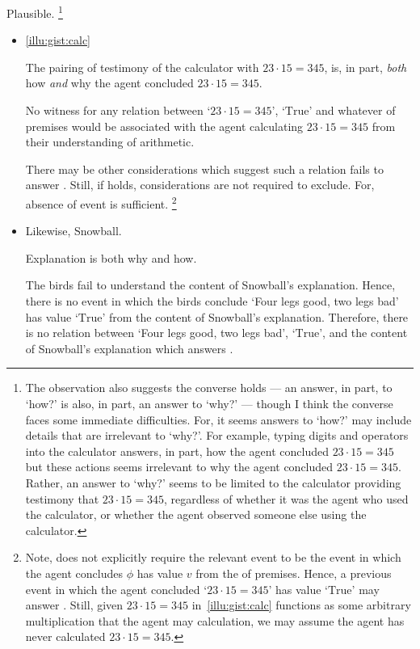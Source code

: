 \begin{note}
  Plausible.%
  \footnote{
    The observation also suggests the converse holds --- an answer, in part, to `how?' is also, in part, an answer to `why?' --- though I think the converse faces some immediate difficulties.
    For, it seems answers to `how?' may include details that are irrelevant to `why?'.
    For example, typing digits and operators into the calculator answers, in part, how the agent concluded \(23 \cdot 15 = 345\) but these actions seems irrelevant to why the agent concluded \(23 \cdot 15 = 345\).
    Rather, an answer to `why?' seems to be limited to the calculator providing testimony that \(23 \cdot 15 = 345\), regardless of whether it was the agent who used the calculator, or whether the agent observed someone else using the calculator.
  }

  \begin{itemize}
  \item
    \autoref{illu:gist:calc}

    The pairing of testimony of the calculator with \(23 \cdot 15 = 345\), is, in part, \emph{both} how \emph{and} why the agent concluded \(23 \cdot 15 = 345\).

    No witness for any relation between `\(23 \cdot 15 = 345\)', `\(\text{True}\)' and whatever \poP{} of premises would be associated with the agent calculating \(23 \cdot 15 = 345\) from their understanding of arithmetic.

    There may be other considerations which suggest such a relation fails to answer \qWhy{}.
    Still, if \issueInclusion{} holds, considerations are not required to exclude.
    For, absence of event is sufficient.%
    \footnote{
      Note, \qHow{} does not explicitly require the relevant event to be the event in which the agent concludes \(\phi\) has value \(v\) from the \poP{} of premises.
      Hence, a previous event in which the agent concluded `\(23 \cdot 15 = 345\)' has value `\(\text{True}\)' may answer \qHow{}.
      Still, given \(23 \cdot 15 = 345\) in~\autoref{illu:gist:calc} functions as some arbitrary multiplication that the agent may calculation, we may assume the agent has never calculated \(23 \cdot 15 = 345\).
    }

  \item
    Likewise, Snowball.

    Explanation is both why and how.

    The birds fail to understand the content of Snowball's explanation.
    Hence, there is no event in which the birds conclude `Four legs good, two legs bad' has value `\(\text{True}\)' from the content of Snowball's explanation.
    Therefore, there is no relation between `Four legs good, two legs bad', `\(\text{True}\)', and the content of Snowball's explanation which answers \qWhy{}.
  \end{itemize}
\end{note}

